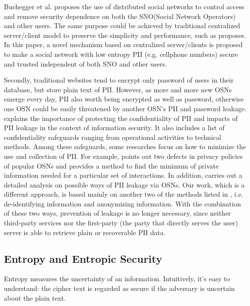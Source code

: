 \documentclass[10pt, conference, compsocconf]{IEEEtran}
\begin{document}
	Buchegger et al.\cite{lzf3, lzf4} proposes the use of distributed social networks
	to control access and
	remove security dependence on both the SNO(Social Network Operators) and other users.
	The same purpose could be achieved by traditional centralized server/client model
	to preserve the simplicity and performance, such as \cite{lzf5} proposes.
	In this paper, a novel mechanism based on centralized 
	server/clients is proposed to make a social network with low entropy PII
	(e.g. cellphone numbers) secure and trusted independent of both SNO and other users.
	
	Secondly, traditional websites tend to encrypt only password of users in their database, 
	but store plain text of PII. However, as more and more new OSNs emerge every day, 
	PII also worth being encrypted as well as password, otherwise
	one OSN could be easily threatened by another OSN's PII and password leakage. \cite{guide}
	explains the importance of protecting the confidentiality of PII 
	and impacts of PII leakage in the 
	context of information security. It also includes a list of confidentiality 
	safeguards ranging from operational activities to technical methods. Among 
	these safeguards, some researches focus on how to minimize the use and 
	collection of PII. For example, \cite{charact} points out two defects 
	in privacy policies of popular OSNs and provides a method to find the minimum 
	of private information needed for a particular set of interactions. In addition, 
	\cite{leakage} carries out a detailed analysis on possible ways of PII 
	leakage via OSNs. Our work, which is a different approach, is based mainly 
	on another two of the methods listed in \cite{guide}, i.e. de-identifying 
	information and anonymizing information. With the combination of these two ways, 
	prevention of leakage is no longer necessary, since neither third-party services 
	nor the first-party (the party that directly serves the user) server is able to 
	retrieve plain or recoverable PII data.
	
	\subsection{Entropy and Entropic Security}
	Entropy\cite{entropy} measures the uncertainty of an information. Intuitively, it's easy to
	understand: the cipher text is regarded as secure
	if the adversary is uncertain about the plain text.
	
\end{document}
